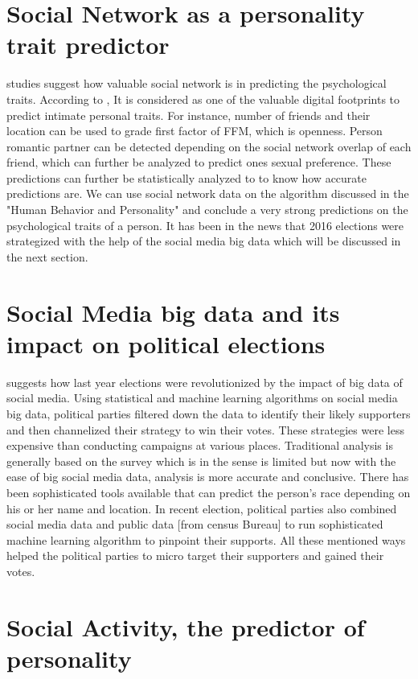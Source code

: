 \documentclass[sigconf]{acmart}
\begin{document}
\section{Social Network as a personality trait predictor}
 \cite{ref13} studies suggest how valuable social network is in predicting the psychological traits.  According to \cite{ref13}, It is considered as one of the valuable digital footprints to predict intimate personal traits. For instance, number of friends and their location can be used to grade first factor of FFM, which is openness. Person romantic partner can be detected depending on the social network overlap of each friend, which can further be analyzed to predict one\textquotesingle s sexual preference. These predictions can further be statistically analyzed to \cite{ref12} to know how accurate predictions are. We can use social network data on the algorithm discussed in the "Human Behavior and Personality" and conclude a very strong predictions on the psychological traits of a person. It has been in the news that 2016 elections were strategized with the help of the social media big data which will be discussed in the next section.
 
\section{Social Media big data and its impact on political elections}

\cite{ref14} suggests how last year elections were revolutionized by the impact of big data of social media. Using statistical and machine learning  algorithms on social media big data, political parties filtered down the data to identify their likely supporters and then channelized their strategy to win their votes. These strategies were less expensive than conducting campaigns at various places.  Traditional analysis is generally based on the  survey which is in the sense is limited \cite{ref15} but now with the ease of big social media data, analysis is more accurate and conclusive. There has been sophisticated tools available that can predict the person’s race depending on his or her name and location. In recent election, political parties also combined social media data and public data [from census Bureau] to run sophisticated machine learning algorithm to pinpoint their supports.  All these mentioned ways helped the political parties to micro target their supporters and gained their votes. 

\section{Social Activity, the predictor of personality}
\end{document}
